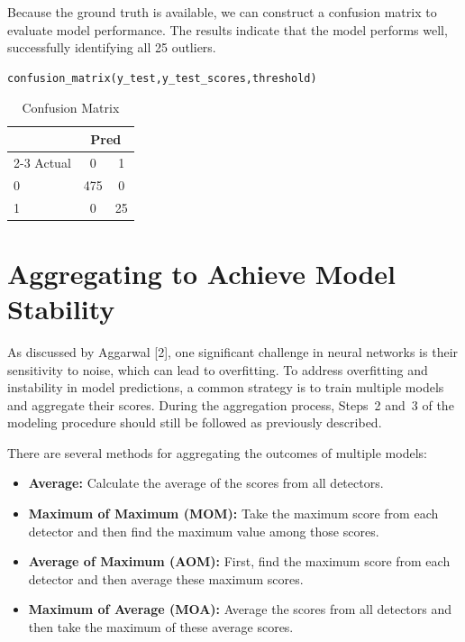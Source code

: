 Because the ground truth is available, we can construct a confusion matrix to evaluate model performance. The results indicate that the model performs well, successfully identifying all 25 outliers.
\begin{lstlisting}[language=Python]
confusion_matrix(y_test,y_test_scores,threshold)
\end{lstlisting}

\begin{table}[ht]
\centering
\caption{Confusion Matrix}
\begin{tabular}{lcc}
\hline
 & \multicolumn{2}{c}{Pred} \\
\cline{2-3}
Actual & 0 & 1 \\
\hline
0 & 475 & 0 \\
1 & 0 & 25 \\
\hline
\end{tabular}
\label{tab:confusion_matrix}
\end{table}



\section{Aggregating to Achieve Model Stability}

As discussed by Aggarwal [2], one significant challenge in neural networks is their sensitivity to noise, which can lead to overfitting. To address overfitting and instability in model predictions, a common strategy is to train multiple models and aggregate their scores. During the aggregation process, Steps~2 and~3 of the modeling procedure should still be followed as previously described.

There are several methods for aggregating the outcomes of multiple models:

\begin{itemize}
    \item \textbf{Average:} Calculate the average of the scores from all detectors.
    
    \item \textbf{Maximum of Maximum (MOM):} Take the maximum score from each detector and then find the maximum value among those scores.
    
    \item \textbf{Average of Maximum (AOM):} First, find the maximum score from each detector and then average these maximum scores.
    
    \item \textbf{Maximum of Average (MOA):} Average the scores from all detectors and then take the maximum of these average scores.
\end{itemize}

